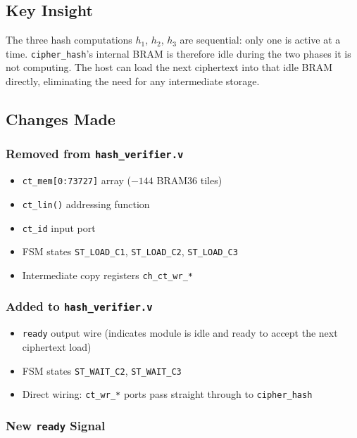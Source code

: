 \documentclass[12pt, a4paper]{article}
\begin{document}
\subsection{Key Insight}

The three hash computations $h_1$, $h_2$, $h_3$ are sequential: only
one is active at a time. \texttt{cipher\_hash}'s internal BRAM is
therefore idle during the two phases it is not computing. The host can
load the next ciphertext into that idle BRAM directly, eliminating the
need for any intermediate storage.

\subsection{Changes Made}

\subsubsection{Removed from \texttt{hash\_verifier.v}}
\begin{itemize}
  \item \texttt{ct\_mem[0:73727]} array ($-144$ BRAM36 tiles)
  \item \texttt{ct\_lin()} addressing function
  \item \texttt{ct\_id} input port
  \item FSM states \texttt{ST\_LOAD\_C1}, \texttt{ST\_LOAD\_C2},
        \texttt{ST\_LOAD\_C3}
  \item Intermediate copy registers \texttt{ch\_ct\_wr\_*}
\end{itemize}

\subsubsection{Added to \texttt{hash\_verifier.v}}
\begin{itemize}
  \item \texttt{ready} output wire (indicates module is idle and
        ready to accept the next ciphertext load)
  \item FSM states \texttt{ST\_WAIT\_C2}, \texttt{ST\_WAIT\_C3}
  \item Direct wiring: \texttt{ct\_wr\_*} ports pass straight through
        to \texttt{cipher\_hash}
\end{itemize}

\subsubsection{New \texttt{ready} Signal}
\end{document}
